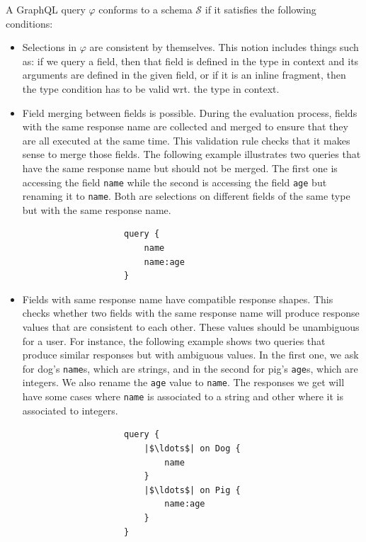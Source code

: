 \begin{definition}
A GraphQL query $\varphi$ conforms to a schema $\mathcal{S}$ if it satisfies the following conditions:
\begin{itemize}
    \item Selections in $\varphi$ are consistent by themselves. This notion includes things such as: if we query a field, then that field is defined in the  type in context and its arguments are defined in the given field, or if it is an inline fragment, then the type condition has to be valid wrt. the type in context.

    \item Field merging between fields is possible. During the evaluation process, fields with the same response name are collected and merged to ensure that they are all executed at the same time. This validation rule checks that it makes sense to merge those fields. The following example illustrates two queries that have the same response name but should not be merged. The first one is accessing the field \texttt{name} while the second is accessing the field \texttt{age} but renaming it to \texttt{name}. Both are selections on different fields of the same type but with the same response name.
    \begin{verbatim}
                    query {
                        name
                        name:age
                    }
    \end{verbatim}

    \item Fields with same response name have compatible response shapes. This checks whether two fields with the same response name will produce response values that are consistent to each other. These values should be unambiguous for a user. For instance, the following example shows two queries that produce similar responses but with ambiguous values. In the first one, we ask for dog's \texttt{name}s, which are strings, and in the second for pig's \texttt{age}s, which are integers. We also rename the \texttt{age} value to \texttt{name}. The responses we get will have some cases where \texttt{name} is associated to a string and other where it is associated to integers.
    \begin{verbatim}
                    query {
                        |$\ldots$| on Dog {
                            name
                        }
                        |$\ldots$| on Pig {
                            name:age
                        }
                    }
    \end{verbatim}
\end{itemize}
\end{definition}


